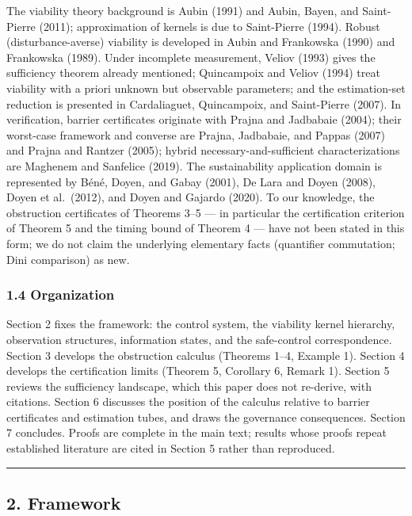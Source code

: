 \documentclass[11pt]{article}
\begin{document}
The viability theory background is Aubin (1991) and Aubin, Bayen, and
Saint-Pierre (2011); approximation of kernels is due to Saint-Pierre
(1994). Robust (disturbance-averse) viability is developed in Aubin and
Frankowska (1990) and Frankowska (1989). Under incomplete measurement,
Veliov (1993) gives the sufficiency theorem already mentioned;
Quincampoix and Veliov (1994) treat viability with a priori unknown but
observable parameters; and the estimation-set reduction is presented in
Cardaliaguet, Quincampoix, and Saint-Pierre (2007). In verification,
barrier certificates originate with Prajna and Jadbabaie (2004); their
worst-case framework and converse are Prajna, Jadbabaie, and Pappas
(2007) and Prajna and Rantzer (2005); hybrid necessary-and-sufficient
characterizations are Maghenem and Sanfelice (2019). The sustainability
application domain is represented by B\'en\'e, Doyen, and Gabay (2001), De
Lara and Doyen (2008), Doyen et al.~(2012), and Doyen and Gajardo
(2020). To our knowledge, the obstruction certificates of Theorems 3--5
--- in particular the certification criterion of Theorem 5 and the
timing bound of Theorem 4 --- have not been stated in this form; we do
not claim the underlying elementary facts (quantifier commutation; Dini
comparison) as new.

\subsubsection{1.4 Organization}\label{organization}

Section 2 fixes the framework: the control system, the viability kernel
hierarchy, observation structures, information states, and the
safe-control correspondence. Section 3 develops the obstruction calculus
(Theorems 1--4, Example 1). Section 4 develops the certification limits
(Theorem 5, Corollary 6, Remark 1). Section 5 reviews the sufficiency
landscape, which this paper does not re-derive, with citations. Section
6 discusses the position of the calculus relative to barrier
certificates and estimation tubes, and draws the governance
consequences. Section 7 concludes. Proofs are complete in the main text;
results whose proofs repeat established literature are cited in Section 5 rather than reproduced.

\begin{center}\rule{0.5\linewidth}{0.5pt}\end{center}

\subsection{2. Framework}\label{framework}
\end{document}
